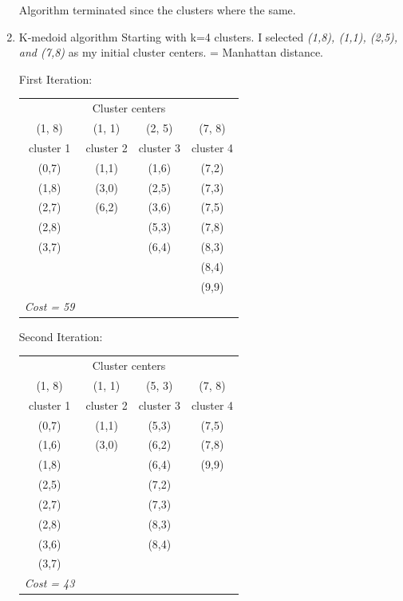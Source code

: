 \documentclass[10pt,a4paper]{article}
\begin{document}
\begin{enumerate}
			Algorithm terminated since the clusters where the same.
			
		
		\clearpage
		\item K-medoid algorithm \newline
			Starting with k=4 clusters. I selected \textit{(1,8), (1,1), (2,5), \textrm{and} (7,8)} as my initial cluster centers. \newline
			 = Manhattan distance. \newline
			
			First Iteration:
			\begin{table}[h!]
				\centering
				\begin{tabular}{cccc}
					\toprule
					\multicolumn{4}{c}{Cluster centers} \\
					(1, 8) & (1, 1) & (2, 5) & (7, 8) \\
					cluster 1 &	cluster 2 &	cluster 3 & cluster 4 \\ \midrule
					(0,7) & (1,1) & (1,6) & (7,2) \\
					(1,8) & (3,0) & (2,5) & (7,3) \\
					(2,7) & (6,2) & (3,6) & (7,5) \\
					(2,8) &  & (5,3) & (7,8) \\
					(3,7) &  & (6,4) & (8,3) \\
					 &  &  & (8,4) \\
					 &  &  & (9,9) \\ \midrule
					 \textit{Cost = 59}	& & & \\			
					\bottomrule					
				\end{tabular}
			\end{table}
		
			Second Iteration:
			\begin{table}[h!]
				\centering
				\begin{tabular}{cccc}
					\toprule
					\multicolumn{4}{c}{Cluster centers} \\
					(1, 8) & (1, 1) & (5, 3) & (7, 8) \\
					cluster 1 &	cluster 2 &	cluster 3 & cluster 4 \\ \midrule
					(0,7) & (1,1) & (5,3) & (7,5) \\
					(1,6) & (3,0) & (6,2) & (7,8) \\
					(1,8) &  & (6,4) & (9,9) \\
					(2,5) &  & (7,2) & \\
					(2,7) &  & (7,3) & \\
					(2,8) &  & (8,3) & \\
					(3,6) &  & (8,4) & \\ 
					(3,7) &  & 	& \\ \midrule
					\textit{Cost = 43} & & & \\	
					\bottomrule					
				\end{tabular}
			\end{table}
		

\end{enumerate}
\end{document}

